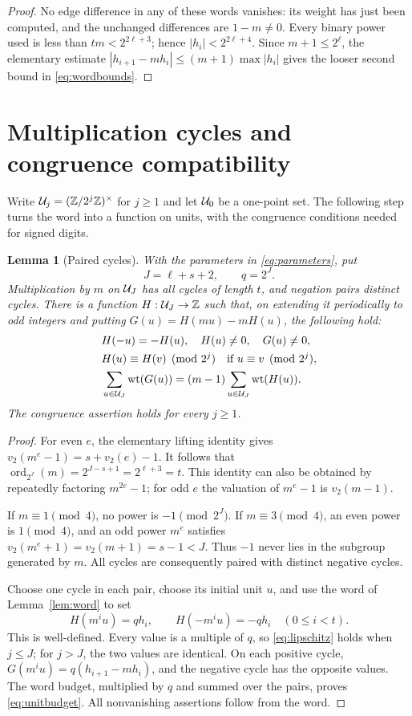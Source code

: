 \documentclass[11pt,a4paper]{article}
\newtheorem{lemma}[theorem]{Lemma}
\theoremstyle{definition}\newtheorem{definition}[theorem]{Definition}
\theoremstyle{remark}\newtheorem{remark}[theorem]{Remark}
\DeclareMathOperator{\ord}{ord}
\begin{document}
\begin{proof}
No edge difference in any of these words vanishes: its weight has
just been computed, and the unchanged differences are $1-m\ne0$.
Every binary power used is less than $tm<2^{2\ell+3}$; hence
$|h_i|<2^{2\ell+4}$. Since $m+1\le2^\ell$, the elementary estimate
$|h_{i+1}-mh_i|\le(m+1)\max|h_i|$ gives the looser second bound
in \eqref{eq:wordbounds}.
\end{proof}

\section{Multiplication cycles and congruence compatibility}
Write $\mathcal U_j=(\mathbb Z/2^j\mathbb Z)^\times$ for $j\ge1$ and let $\mathcal U_0$
be a one-point set. The following step turns the word into a function
on units, with the congruence conditions needed for signed digits.

\begin{lemma}[Paired cycles]\label{lem:cycles}
With the parameters in \eqref{eq:parameters}, put
\[
 J=\ell+s+2,\qquad q=2^J.
\]
Multiplication by $m$ on $\mathcal U_J$ has all cycles of length $t$, and
negation pairs distinct cycles. There is a function $H:\mathcal U_J\to\mathbb Z$
such that, on extending it periodically to odd integers and putting
$G(u)=H(mu)-mH(u)$, the following hold:
\begin{align}
 &H(-u)=-H(u),\quad H(u)\ne0,\quad G(u)\ne0,\label{eq:anti}\\
 &H(u)\equiv H(v)\pmod{2^j}\quad\hbox{if }u\equiv v\pmod{2^j},\label{eq:lipschitz}\\
 &\sum_{u\in\mathcal U_J}\operatorname{wt}(G(u))
       =(m-1)\sum_{u\in\mathcal U_J}\operatorname{wt}(H(u)).\label{eq:unitbudget}
\end{align}
The congruence assertion holds for every $j\ge1$.
\end{lemma}
\begin{proof}
For even $e$, the elementary lifting identity gives
$v_2(m^e-1)=s+v_2(e)-1$. It follows that
$\ord_{2^J}(m)=2^{J-s+1}=2^{\ell+3}=t$. This identity can also be
obtained by repeatedly factoring $m^{2e}-1$; for odd $e$ the valuation
of $m^e-1$ is $v_2(m-1)$.

If $m\equiv1\pmod4$, no power is $-1\pmod{2^J}$.
If $m\equiv3\pmod4$, an even power is $1\pmod4$, and an odd power
$m^e$ satisfies $v_2(m^e+1)=v_2(m+1)=s-1<J$. Thus $-1$ never lies
in the subgroup generated by $m$. All cycles are consequently paired
with distinct negative cycles.

Choose one cycle in each pair, choose its initial unit $u$, and use the
word of Lemma~\ref{lem:word} to set
\[
 H(m^iu)=q h_i,\qquad H(-m^iu)=-q h_i\quad(0\le i<t).
\]
This is well-defined. Every value is a multiple of $q$, so
\eqref{eq:lipschitz} holds when $j\le J$; for $j>J$, the two values
are identical. On each positive cycle, $G(m^iu)=q(h_{i+1}-mh_i)$,
and the negative cycle has the opposite values. The word budget,
multiplied by $q$ and summed over the pairs, proves
\eqref{eq:unitbudget}. All nonvanishing assertions follow from the word.
\end{proof}
\end{document}
